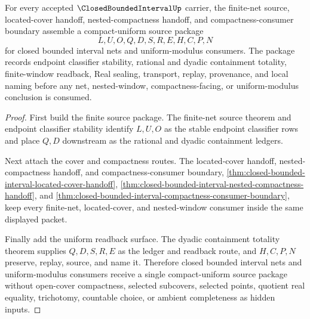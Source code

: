 \begin{theorem}
\label{thm:closed-bounded-interval-compact-uniform-source-package}
For every accepted $\ClosedBoundedIntervalUp$ carrier, the finite-net source, located-cover handoff, nested-compactness handoff, and compactness-consumer boundary assemble a compact-uniform source package
$$
L,U,O,Q,D,S,R,E,H,C,P,N
$$
for closed bounded interval nets and uniform-modulus consumers. The package records endpoint classifier stability, rational and dyadic containment totality, finite-window readback, Real sealing, transport, replay, provenance, and local naming before any net, nested-window, compactness-facing, or uniform-modulus conclusion is consumed.
\end{theorem}
\begin{proof}
First build the finite source package. The finite-net source theorem and endpoint classifier stability identify $L,U,O$ as the stable endpoint classifier rows and place $Q,D$ downstream as the rational and dyadic containment ledgers.

Next attach the cover and compactness routes. The located-cover handoff, nested-compactness handoff, and compactness-consumer boundary, \autoref{thm:closed-bounded-interval-located-cover-handoff}, \autoref{thm:closed-bounded-interval-nested-compactness-handoff}, and \autoref{thm:closed-bounded-interval-compactness-consumer-boundary}, keep every finite-net, located-cover, and nested-window consumer inside the same displayed packet.

Finally add the uniform readback surface. The dyadic containment totality theorem supplies $Q,D,S,R,E$ as the ledger and readback route, and $H,C,P,N$ preserve, replay, source, and name it. Therefore closed bounded interval nets and uniform-modulus consumers receive a single compact-uniform source package without open-cover compactness, selected subcovers, selected points, quotient real equality, trichotomy, countable choice, or ambient completeness as hidden inputs.
\end{proof}


